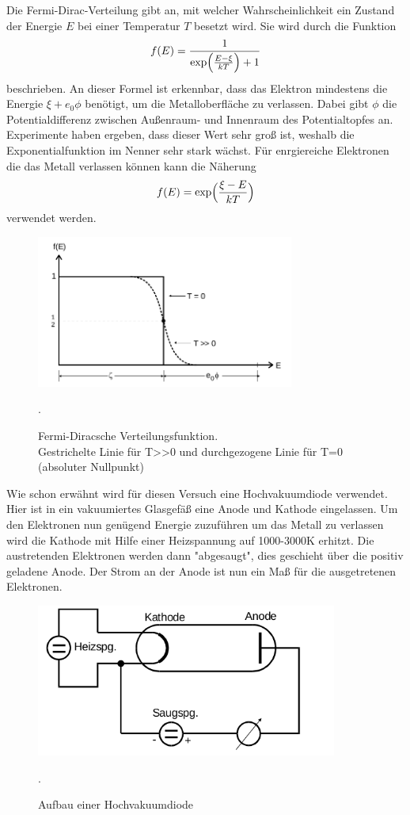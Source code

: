 Die Fermi-Dirac-Verteilung gibt an, mit welcher Wahrscheinlichkeit ein Zustand der
Energie $E$ bei einer Temperatur $T$ besetzt wird. Sie wird durch die Funktion
\begin{equation}
  f(E)=\frac{1}{\exp\Bigl(\frac{E-\xi}{kT}\Bigr)+1}
  \label{eqn:fermi1}
\end{equation}
beschrieben. An dieser Formel ist erkennbar, dass das Elektron mindestens die Energie
$\xi+e_{0}\phi$ benötigt, um die Metalloberfläche zu verlassen. Dabei gibt $\phi$
die Potentialdifferenz zwischen Außenraum- und Innenraum des Potentialtopfes an.
Experimente haben ergeben, dass dieser Wert sehr groß ist, weshalb die
Exponentialfunktion im Nenner sehr stark wächst.
Für enrgiereiche Elektronen die das Metall verlassen können kann die Näherung
\begin{equation}
  f(E)=\exp\Bigl(\frac{\xi-E}{kT}\Bigr)
  \label{eqn:fermi2}
\end{equation}
verwendet werden.

\begin{figure}[H]
  \centering
  \includegraphics[height=5cm]{Fermi.png}
  \caption{Fermi-Diracsche Verteilungsfunktion.\\
  Gestrichelte Linie für T>>0 und durchgezogene Linie für T=0 (absoluter Nullpunkt)}
  \label{fig:fermi}
  \cite{skript}.
\end{figure}

Wie schon erwähnt wird für diesen Versuch eine Hochvakuumdiode verwendet. Hier ist
in ein vakuumiertes Glasgefäß eine Anode und Kathode eingelassen. Um den Elektronen
nun genügend Energie zuzuführen um das Metall zu verlassen wird die Kathode mit Hilfe einer
Heizspannung auf 1000-3000\;K erhitzt. Die austretenden Elektronen werden dann "abgesaugt", dies geschieht
über die positiv geladene Anode. Der Strom an der Anode ist nun ein Maß für die
ausgetretenen Elektronen.

\begin{figure}[H]
  \centering
  \includegraphics[height=5cm]{Aufbau.png}
  \caption{Aufbau einer Hochvakuumdiode}
  \label{fig:vakuum}
  \cite{skript}.
\end{figure}

